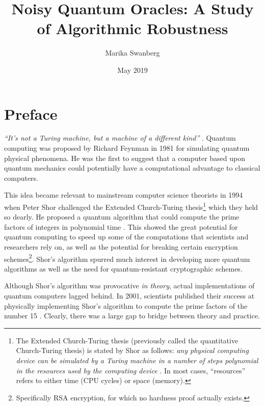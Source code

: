 \documentclass[12pt,twoside]{reedthesis}
\title{Noisy Quantum Oracles: A Study of Algorithmic Robustness}
\author{Marika Swanberg}
\date{May 2019}
\theoremstyle{definition}
\begin{document}
  \maketitle
  \frontmatter %
  \pagestyle{empty} %


	

   \chapter*{Preface}

  
\emph{``It's not a Turing machine, but a machine of a different kind''} \citep{feynman1982simulating}. Quantum computing was proposed by Richard Feynman in 1981 for simulating quantum physical phenomena. He was the first to suggest that a computer based upon quantum mechanics could potentially have a computational advantage to classical computers. 

This idea became relevant to mainstream computer science theorists in 1994 when Peter Shor challenged the Extended Church-Turing thesis\footnote{The Extended Church-Turing thesis (previously called the quantitative Church-Turing thesis) is stated by Shor as follows: \emph{any physical computing device can be simulated by a Turing machine in a number of steps polynomial in the resources used by the computing device }\citep{shor1999polynomial}. In most cases, ``resources'' refers to either time (CPU cycles) or space (memory).} which they held so dearly. He proposed a quantum algorithm that could compute the prime factors of integers in polynomial time \citep{shor1999polynomial}. This showed the great potential for quantum computing to speed up some of the computations that scientists and researchers rely on, as well as the potential for breaking certain encryption schemes\footnote{Specifically RSA encryption, for which no hardness proof actually exists.}. Shor's algorithm spurred much interest in developing more quantum algorithms as well as the need for quantum-resistant cryptographic schemes.


Although Shor's algorithm was provocative \emph{in theory}, actual implementations of quantum computers lagged behind. In 2001, scientists published their success at physically implementing Shor's algorithm to compute the prime factors of the number 15  \citep{experimentalshor2001}. Clearly, there was a large gap to bridge between theory and practice. 
\end{document}
